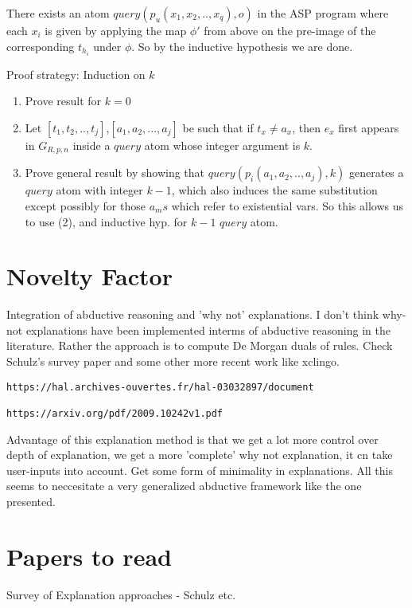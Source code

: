 There exists an atom $query(p_{u}(x_{1},x_{2},..,x_{q}),o)$ in the ASP program
where each $x_{i}$ is given by applying the map $\phi'$ from above on the
pre-image of the corresponding $t_{h_{i}}$ under $\phi$. So by the inductive
hypothesis we are done.


Proof strategy: Induction on $k$
\begin{enumerate}
    \item Prove result for $k =0 $
    \item Let $[t_{1},t_{2},..,t_{j}]$,$[a_{1},a_{2},...,a_{j}]$ be such that if $t_{x}\neq a_{x}$, then $e_{x}$ first appears in $G_{R,p,n}$ inside a $query$ atom whose integer argument is $k$.
    \item Prove general result by showing that $query(p_{i}(a_{1},a_{2},..,a_{j}),k)$ generates a $query$ atom with integer $k-1$, which also induces the same substitution except possibly for those $a_{m}s$ which refer to existential vars. So this allows us to use (2), and inductive hyp. for $k-1$ $query$ atom.
\end{enumerate}
\section{Novelty Factor}
Integration of abductive reasoning and 'why not' explanations. I don't think why-not explanations have been implemented interms of abductive reasoning in the literature. Rather the approach is to compute De Morgan duals of rules. Check Schulz's survey paper and some other more recent work like xclingo. 
\begin{verbatim}
https://hal.archives-ouvertes.fr/hal-03032897/document

https://arxiv.org/pdf/2009.10242v1.pdf
\end{verbatim}
Advantage of this explanation method is that we get a lot more control over depth of explanation, we get a more 'complete' why not explanation, it cn take user-inputs into account. Get some form of minimality in explanations. All this seems to neccesitate a very generalized abductive framework like the one presented.

\section{Papers to read}
Survey of Explanation approaches - Schulz etc.

